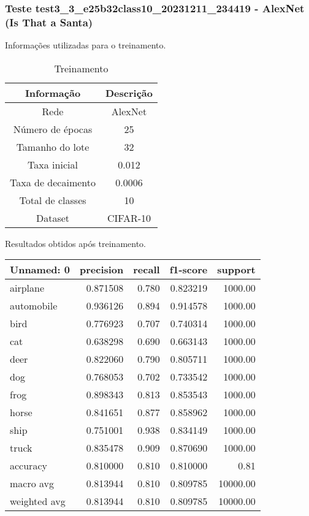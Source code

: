 \subsubsection{Teste test3_3_e25b32class10_20231211_234419 - AlexNet (Is That a Santa)}

Informações utilizadas para o treinamento.

\begin{table}[ht]
   \centering
   \caption{Treinamento}
   \label{tab:modelos}
   \begin{tabular}{| c | c | }
      \hline 
      \textbf{Informação} & \textbf{Descrição} \\
      \hline \hline 
      Rede & AlexNet \\
      \hline
      Número de épocas & 25\\
      \hline
      Tamanho do lote & 32\\
      \hline
      Taxa inicial & 0.012 \\
      \hline
      Taxa de decaimento & 0.0006 \\
      \hline
      Total de classes & 10\\
      \hline
      Dataset & CIFAR-10\\
      \hline
   \end{tabular} 
\end{table}

Resultados obtidos após treinamento.

\begin{tabular}{lrrrr}
\toprule
  Unnamed: 0 &  precision &  recall &  f1-score &  support \\
\midrule
    airplane &   0.871508 &   0.780 &  0.823219 &  1000.00 \\
  automobile &   0.936126 &   0.894 &  0.914578 &  1000.00 \\
        bird &   0.776923 &   0.707 &  0.740314 &  1000.00 \\
         cat &   0.638298 &   0.690 &  0.663143 &  1000.00 \\
        deer &   0.822060 &   0.790 &  0.805711 &  1000.00 \\
         dog &   0.768053 &   0.702 &  0.733542 &  1000.00 \\
        frog &   0.898343 &   0.813 &  0.853543 &  1000.00 \\
       horse &   0.841651 &   0.877 &  0.858962 &  1000.00 \\
        ship &   0.751001 &   0.938 &  0.834149 &  1000.00 \\
       truck &   0.835478 &   0.909 &  0.870690 &  1000.00 \\
    accuracy &   0.810000 &   0.810 &  0.810000 &     0.81 \\
   macro avg &   0.813944 &   0.810 &  0.809785 & 10000.00 \\
weighted avg &   0.813944 &   0.810 &  0.809785 & 10000.00 \\
\bottomrule
\end{tabular}


